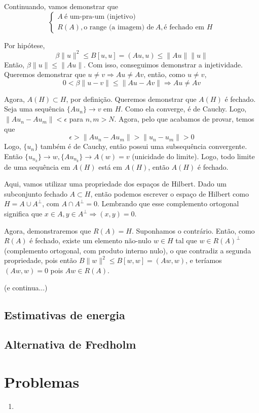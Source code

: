 \documentclass[a4paper, 11pt]{book}
\newcommand{\e}{\epsilon}
\begin{document}
Continuando, vamos demonstrar que
\[\begin{cases}
	A \ \text{é um-pra-um (injetivo)} \\
	R(A), \text{o range (a imagem) de}\ A, \text{é fechado em } H
\end{cases}\]

Por hipótese,
\[
\beta \|u\|^2 \leq B[u,u] = (Au, u) \leq \|Au\| \|u\|	
\]
Então, $\beta \| u\| \leq \| Au \|$. Com isso, conseguimos demonstrar a injetividade. Queremos demonstrar que $u\neq v \Rightarrow Au \neq Av$, então, como $u \neq v$,
\[
	0 < \beta \| u - v \| \leq \| Au - Av \| \Rightarrow Au \neq Av
\]

Agora, $A(H)\subset H$, por definição. Queremos demonstrar que $A(H)$ é fechado. Seja uma sequência $\{Au_n\} \rightarrow v$ em $H$. Como ela converge, é de Cauchy. Logo, $\| Au_n - Au_m \| < \e$ para $n,m > N$. Agora, pelo que acabamos de provar, temos que \[
\e > \| Au_n - Au_m \| > \| u_n - u_m \| > 0	
\] Logo, $\{u_n\}$ também é de Cauchy, então possui uma subsequência convergente. Então $\{u_{n_k}\} \rightarrow w, \{ Au_{n_k} \} \rightarrow A(w) = v$ (unicidade do limite). Logo, todo limite de uma sequência em $A(H)$ está em $A(H)$, então $A(H)$ é fechado.

Aqui, vamos utilizar uma propriedade dos espaços de Hilbert. Dado um subconjunto fechado $A \subset H$, então podemos escrever o espaço de Hilbert como $H = A \cup A^{\perp}$, com $A \cap A^{\perp} = 0$. Lembrando que esse complemento ortogonal significa que $x \in A, y \in A^{\perp} \Rightarrow (x, y) = 0$.

Agora, demonstraremos que $R(A)=H$. Suponhamos o contrário. Então, como $R(A)$ é fechado, existe um elemento não-nulo $w \in H$ tal que $w \in R(A)^{\perp}$ (complemento ortogonal, com produto interno nulo), o que contradiz a segunda propriedade, pois então $B \| w \|^2 \leq B[w,w] = (Aw,w)$, e teríamos $(Aw,w)=0$ pois $Aw \in R(A)$.

(e continua...)



\subsection{Estimativas de energia}
\subsection{Alternativa de Fredholm}



\section{Problemas}

\begin{enumerate}
	\item 
\end{enumerate}
\end{document}
